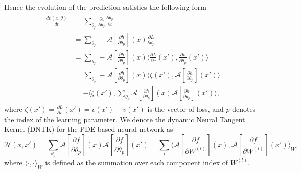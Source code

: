 \documentclass[hyperref]{article}
\newcommand{\pl}{\partial}
\numberwithin{equation}{section}
\theoremstyle{nonumberplain}
\begin{document}
	Hence the evolution of the prediction satisfies the following form
	\begin{align}
		\begin{split}
			\frac{dv(x,\theta)}{dt} &= \sum_{\theta_p}\frac{\pl v}{\pl \theta_p}\frac{\pl \theta_p}{\pl t} \\
			&=\sum_{\theta_p}-\mathcal{A}[\frac{\pl h}{\pl \theta_p}](x)\frac{\pl L}{\pl \theta_p}\\
			&=\sum_{\theta_p}-\mathcal{A}[\frac{\pl h}{\pl \theta_p}](x)\langle\frac{\pl L}{\pl v}(x'),\frac{\pl v}{\pl \theta_p}(x')\rangle\\
			&=\sum_{\theta_p}-\mathcal{A}[\frac{\pl h}{\pl \theta_p}](x)\langle \zeta(x'),\mathcal{A}[\frac{\pl h}{\pl \theta_p}](x')\rangle\\
			&=-\langle \zeta(x'), \sum_{\theta_p}\mathcal{A}[\frac{\pl h}{\pl \theta_p}](x)\mathcal{A}[\frac{\pl h}{\pl \theta_p}](x')\rangle,
		\end{split}
	\end{align}
	where $\zeta(x') = \frac{\pl L}{\pl v}(x')=v(x')-\tilde{v}(x')$ is the vector of loss,  and $p$ denotes the index of the learning parameter. We denote the dynamic Neural Tangent Kernel (DNTK) for the PDE-based neural network as 
	\begin{equation}
		\mathcal{N}(x,x') = \sum_{\theta_p}\mathcal{A}[\frac{\pl f}{\pl \theta_p}](x)\mathcal{A}[\frac{\pl f}{\pl \theta_p}](x')=\sum_{l}\langle\mathcal{A}[\frac{\pl f}{\pl W^{(l)}}](x),\mathcal{A}[\frac{\pl f}{\pl W^{(l)}}](x')\rangle_W,
	\end{equation}
	where $\langle\cdot,\cdot\rangle_W$ is defined as the summation over each component index of $W^{(l)}$.
	
\end{document}
